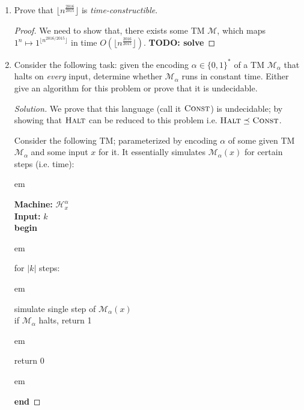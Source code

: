 \documentclass[usletter]{article}
\newcommand {\langset}[1]      {\ensuremath{\mathcal{#1}}}
\newcommand {\machine}[1]      {\ensuremath{\mathscr{#1}}}
\newcommand {\langfunc}        {\ensuremath{\mathfrak{L}}}
\newcommand {\namedlangset}[1] {\ensuremath{\textnormal{\textsc{#1}}}}
\newcommand {\family}[1]       {\ensuremath{\mathsf{#1}}}
\newcommand {\term}[1]      {\textit{#1}}
\newcommand {\reduce}[2]    {\ensuremath{\preceq_{#1}^{#2}}}
\newcommand {\indpar}[1]   {
  \par\leftskip=#1em
  \noindent\ignorespaces
}
\newenvironment{turing}[2] {
  \smallskip
  \indpar{2}
  \textbf{Machine:} #1\\
  \textbf{Input:} $#2$\\[5pt]
  \textbf{begin}
  \parskip=0pt
  \indpar{3}
}{
  \indpar{2}
  \textbf{end}
  \par\medskip
}
\newcommand{\ie}{\textnormal{i.e. }}
\newcommand{\todo}[1]{{\large \textbf{TODO: #1}}}
\newcommand {\langL}          {\langset{L}}
\newcommand {\machineM}       {\machine{M}}
\newcommand {\allstrings}     {\ensuremath{\{0,1\}^*}}
\begin{document}
\begin{enumerate}
\begin{proof}
    Thus, we have proved that
    $\langfunc(\machineM') =
     \langL_1 \cup (\langL_2 \cap \langL_3) \in \family{NP}$.
  \end{proof}

  \begin{remark}
    In fact, we can always treat unions as disjunctions and intersections as
    conjunctions over machine outputs;
    to prove that \family{NP} is closed under these operations.
  \end{remark}

  \item Prove that $\lfloor n^{\frac{2016}{2015}} \rfloor$
        is \term{time-constructible}.
  \begin{proof}
    We need to show that, there exists some TM \machineM,
    which maps $1^n \mapsto 1^{\lfloor n^{2016/2015} \rfloor}$
    in time $O(\lfloor n^{\frac{2016}{2015}} \rfloor)$.
    \todo{solve}
  \end{proof}

  \item Consider the following task: given the encoding $\alpha \in \allstrings$
        of a TM $\machineM_\alpha$ that halts on \textit{every} input,
        determine whether $\machineM_\alpha$ runs in constant time.
        Either give an algorithm for this problem
        or prove that it is undecidable.
  \begin{proof}[Solution]
    We prove that this language (call it \namedlangset{Const}) is undecidable;
    by showing that \namedlangset{Halt} can be reduced to this problem
    \ie $\namedlangset{Halt} \reduce{}{} \namedlangset{Const}$.

    Consider the following TM; parameterized by encoding $\alpha$ of some given
    TM $\machineM_\alpha$ and some input $x$ for it. It essentially simulates
    $\machineM_\alpha(x)$ for certain steps (\ie time):
    \begin{turing}{$\machine{H}^\alpha_x$}{k}
      for $|k|$ steps:
        \indpar{4}
        simulate single step of $\machineM_\alpha(x)$ \\
        if $\machineM_\alpha$ halts, return 1
      \indpar{3}
      return 0
    \end{turing}


\end{proof}
\end{enumerate}
\end{document}

